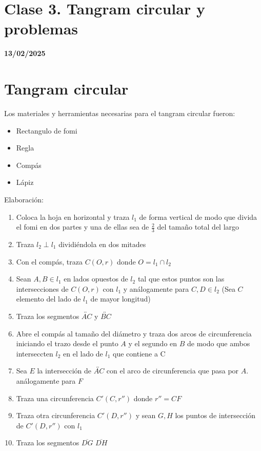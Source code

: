 \section{Clase 3. Tangram circular y problemas}
\textbf{13/02/2025}
\section{Tangram circular}

Los materiales y herramientas necesarias para el tangram circular fueron:
    \begin{itemize}
        
        \item Rectangulo de fomi
        \item Regla
        \item Compás
        \item Lápiz
        
    \end{itemize}

Elaboración:
    \begin{enumerate}
        
        \item Coloca la hoja en horizontal y traza $l_1$ de forma vertical de modo que divida el fomi en dos partes y una de ellas sea de $\frac{2}{3}$ del tamaño total del largo
        \item Traza $l_2 \perp l_1$ dividiéndola en dos mitades
        \item Con el compás, traza $C(O,r)$ donde $O = l_1 \cap l_2$
        \item Sean $A,B \in l_1$ en lados opuestos de $l_2$ tal que  estos puntos son las intersecciones de $C(O,r)$ con $l_1$ y análogamente para $C,D \in l_2$ (Sea $C$ elemento del lado de $l_1$ de mayor longitud)
        
         \item Traza los segmentos $\overleftrightarrow{AC}$ y $\overleftrightarrow{BC}$
         \item Abre el compás al tamaño del diámetro y traza dos arcos de circunferencia iniciando el trazo desde el punto $A$ y el segundo en $B$ de modo que ambos interseccten $l_2$ en el lado de $l_1$ que contiene a C
         \item Sea $E$ la intersección de $\overleftrightarrow{AC}$ con el arco de circunferencia que pasa por $A$. análogamente para $F$
         \item Traza una circunferencia $C'(C,r'')$ donde $r'' = CF $

         \item Traza otra circunferencia $C'(D,r'')$ y sean $G,H$ los puntos de intersección de $C'(D,r'')$ con $l_1$
         \item Traza los segmentos $\overline{DG}$ $\overline{DH}$
      \end{enumerate}

